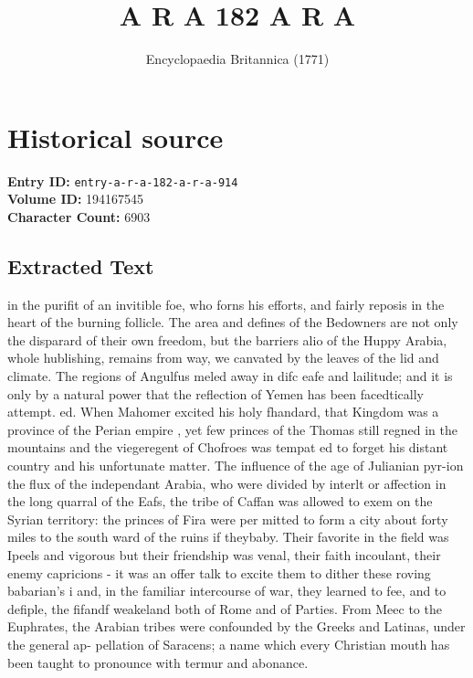 \documentclass{article}
\title{A R A  182  A R A}
\date{Encyclopaedia Britannica (1771)}
\begin{document}
\maketitle

\section*{Historical source}
\textbf{Entry ID:} \texttt{entry-a-r-a-182-a-r-a-914} \\
\textbf{Volume ID:} 194167545 \\
\textbf{Character Count:} 6903

\subsection*{Extracted Text}
in the purifit of an invitible foe, who forns his efforts, and fairly reposis in the heart of the burning follicle. The area and defines of the Bedowners are not only the disparard of their own freedom, but the barriers alio of the Huppy Arabia, whole hublishing, remains from way, we canvated by the leaves of the lid and climate. The regions of Angulfus meled away in difc eafe and lailitude; and it is only by a natural power that the reflection of Yemen has been facedtically attempt. ed. When Mahomer excited his holy fhandard, that Kingdom was a province of the Perian empire , yet few princes of the Thomas still regned in the mountains and the viegeregent of Chofroes was tempat ed to forget his distant country and his unfortunate matter. The influence of the age of Julianian pyr-ion the flux of the independant Arabia, who were divided by interlt or affection in the long quarral of the Eafs, the tribe of Caffan was allowed to exem on the Syrian territory: the princes of Fira were per mitted to form a city about forty miles to the south ward of the ruins if theybaby. Their favorite in the field was Ipeels and vigorous but their friendship was venal, their faith incoulant, their enemy capricions - it was an offer talk to excite them to dither these roving babarian's i and, in the familiar intercourse of war, they learned to fee, and to defiple, the fifandf weakeland both of Rome and of Parties. From Meec to the Euphrates, the Arabian tribes were confounded by the Greeks and Latinas, under the general ap- pellation of Saracens; a name which every Christian mouth has been taught to pronounce with termur and abonance.
\end{document}
